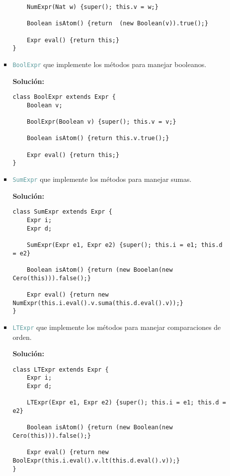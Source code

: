 \documentclass{article}
\newcommand{\tp}[1]{\textcolor{CadetBlue} {\texttt{#1}}}
\newcommand{\tb}[1]{\textcolor{RoyalPurple} {\textbf{#1}}}
\begin{document}
\begin{enumerate}
\begin{enumerate}
\begin{itemize}
\begin{verbatim}
    NumExpr(Nat w) {super(); this.v = w;}

    Boolean isAtom() {return  (new Boolean(v)).true();}

    Expr eval() {return this;}
}
                \end{verbatim}

                \item \tp{BoolExpr} que implemente los métodos para manejar
                booleanos.

                \tb{Solución:}

                \begin{verbatim}
class BoolExpr extends Expr {
    Boolean v;

    BoolExpr(Boolean v) {super(); this.v = v;}

    Boolean isAtom() {return this.v.true();}

    Expr eval() {return this;}
}
                \end{verbatim}

                \item \tp{SumExpr} que implemente los métodos para manejar
                sumas.

                \tb{Solución:}

                \begin{verbatim}
class SumExpr extends Expr {
    Expr i;
    Expr d;

    SumExpr(Expr e1, Expr e2) {super(); this.i = e1; this.d = e2}

    Boolean isAtom() {return (new Booelan(new Cero(this))).false();}

    Expr eval() {return new NumExpr(this.i.eval().v.suma(this.d.eval().v));}
}
                \end{verbatim}

                \item \tp{LTExpr} que implemente los métodos para manejar
                comparaciones de orden.

                \tb{Solución:}

                \begin{verbatim}
class LTExpr extends Expr {
    Expr i;
    Expr d;

    LTExpr(Expr e1, Expr e2) {super(); this.i = e1; this.d = e2}

    Boolean isAtom() {return (new Boolean(new Cero(this))).false();}

    Expr eval() {return new BoolExpr(this.i.eval().v.lt(this.d.eval().v));}
}
                \end{verbatim}


\end{itemize}
\end{enumerate}
\end{enumerate}
\end{document}
